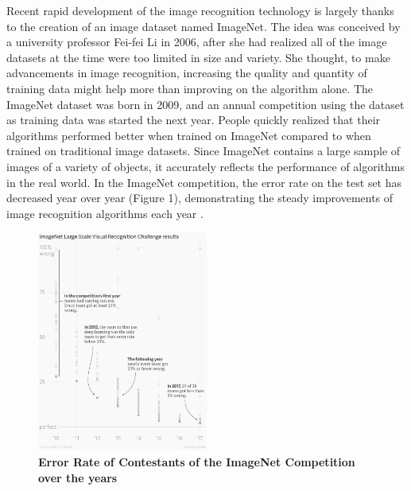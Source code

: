 \documentclass[letterpaper]{article} %
\begin{document}
	Recent rapid development of the image recognition technology is largely thanks to the creation of an image dataset named ImageNet. The idea was conceived by a university professor Fei-fei Li in 2006, after she had realized all of the image datasets at the time were too limited in size and variety. She thought, to make advancements in image recognition, increasing the quality and quantity of training data might help more than improving on the algorithm alone. The ImageNet dataset was born in 2009, and an annual competition using the dataset as training data was started the next year. People quickly realized that their algorithms performed better when trained on ImageNet compared to when trained on traditional image datasets. Since ImageNet contains a large sample of images of a variety of objects, it accurately reflects the performance of algorithms in the real world. In the ImageNet competition, the error rate on the test set has decreased year over year (Figure 1), demonstrating the steady improvements of image recognition algorithms each year \cite{quartz2017image}. 
	
	\begin{figure}[h!]
		\centering
		\includegraphics[width=0.5\textwidth]{intro.png}
		\caption{\textbf{Error Rate of Contestants of the ImageNet Competition over the years}}
		\label{fig:ErrorRate}
	\end{figure}
	
\end{document}
